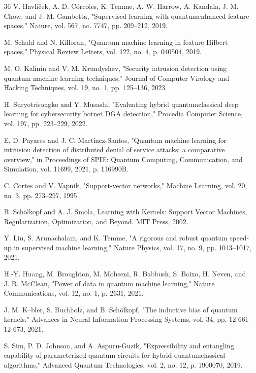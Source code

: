 \begin{thebibliography}{36}
V. Havl\'i\v{c}ek, A. D. C\'orcoles, K. Temme, A. W. Harrow, A. Kandala, J. M. Chow, and J. M. Gambetta, "Supervised learning with quantumenhanced feature spaces," Nature, vol. 567, no. 7747, pp. 209--212, 2019.

M. Schuld and N. Killoran, "Quantum machine learning in feature Hilbert spaces," Physical Review Letters, vol. 122, no. 4, p. 040504, 2019.

M. O. Kalinin and V. M. Krundyshev, "Security intrusion detection using quantum machine learning techniques," Journal of Computer Virology and Hacking Techniques, vol. 19, no. 1, pp. 125--136, 2023.

H. Suryotrisongko and Y. Musashi, "Evaluating hybrid quantumclassical deep learning for cybersecurity botnet DGA detection," Procedia Computer Science, vol. 197, pp. 223--229, 2022.

E. D. Payares and J. C. Mart\'inez-Santos, "Quantum machine learning for intrusion detection of distributed denial of service attacks: a comparative overview," in Proceedings of SPIE: Quantum Computing, Communication, and Simulation, vol. 11699, 2021, p. 116990B.

C. Cortes and V. Vapnik, "Support-vector networks," Machine Learning, vol. 20, no. 3, pp. 273--297, 1995.

B. Sch\"olkopf and A. J. Smola, Learning with Kernels: Support Vector Machines, Regularization, Optimization, and Beyond. MIT Press, 2002.

Y. Liu, S. Arunachalam, and K. Temme, "A rigorous and robust quantum speed-up in supervised machine learning," Nature Physics, vol. 17, no. 9, pp. 1013--1017, 2021.

H.-Y. Huang, M. Broughton, M. Mohseni, R. Babbush, S. Boixo, H. Neven, and J. R. McClean, "Power of data in quantum machine learning," Nature Communications, vol. 12, no. 1, p. 2631, 2021.

J. M. K--bler, S. Buchholz, and B. Sch\"olkopf, "The inductive bias of quantum kernels," Advances in Neural Information Processing Systems, vol. 34, pp. 12 661--12 673, 2021.

S. Sim, P. D. Johnson, and A. Aspuru-Guzik, "Expressibility and entangling capability of parameterized quantum circuits for hybrid quantumclassical algorithms," Advanced Quantum Technologies, vol. 2, no. 12, p. 1900070, 2019.


\end{thebibliography}
